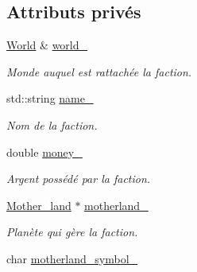 \subsection*{Attributs privés}
\begin{DoxyCompactItemize}
\item 
\hypertarget{classFaction_a6d79b916267324627cddbfc04a4c9a64}{\hyperlink{classWorld}{World} \& \hyperlink{classFaction_a6d79b916267324627cddbfc04a4c9a64}{world\-\_\-}}\label{classFaction_a6d79b916267324627cddbfc04a4c9a64}

\begin{DoxyCompactList}\small\item\em Monde auquel est rattachée la faction. \end{DoxyCompactList}\item 
\hypertarget{classFaction_a632028ec500010c59419327a4cce3532}{std\-::string \hyperlink{classFaction_a632028ec500010c59419327a4cce3532}{name\-\_\-}}\label{classFaction_a632028ec500010c59419327a4cce3532}

\begin{DoxyCompactList}\small\item\em Nom de la faction. \end{DoxyCompactList}\item 
\hypertarget{classFaction_a7414f60b810c31e115e8f6995d47aa6e}{double \hyperlink{classFaction_a7414f60b810c31e115e8f6995d47aa6e}{money\-\_\-}}\label{classFaction_a7414f60b810c31e115e8f6995d47aa6e}

\begin{DoxyCompactList}\small\item\em Argent possédé par la faction. \end{DoxyCompactList}\item 
\hypertarget{classFaction_af9ece6405c2dc01b16a18be59ff2893e}{\hyperlink{classMother__land}{Mother\-\_\-land} $\ast$ \hyperlink{classFaction_af9ece6405c2dc01b16a18be59ff2893e}{motherland\-\_\-}}\label{classFaction_af9ece6405c2dc01b16a18be59ff2893e}

\begin{DoxyCompactList}\small\item\em Planète qui gère la faction. \end{DoxyCompactList}\item 
\hypertarget{classFaction_aee4de39f54f688641def6c0af48dfb29}{char \hyperlink{classFaction_aee4de39f54f688641def6c0af48dfb29}{motherland\-\_\-symbol\-\_\-}}\label{classFaction_aee4de39f54f688641def6c0af48dfb29}


\end{DoxyCompactItemize}
